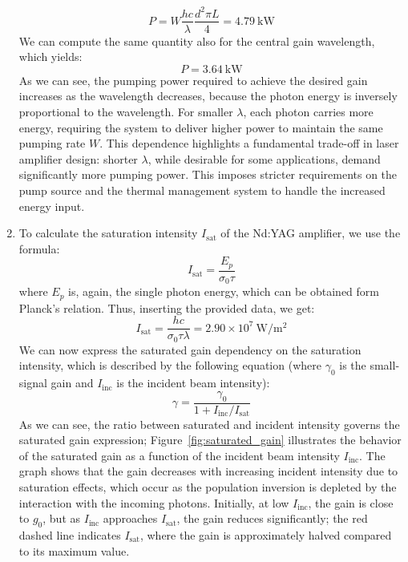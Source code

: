 \documentclass[prl, 11 pt]{revtex4-2}
\begin{document}
\begin{enumerate}
    $$
    P = W \frac{hc}{\lambda} \frac{d^2\pi L}{4} = 4.79~\si{\kW}
    $$
    We can compute the same quantity also for the central gain wavelength, which yields:
    $$
        P = 3.64~\si{\kW}
    $$
    As we can see, the pumping power required to achieve the desired gain increases as the wavelength decreases, because the photon energy is inversely proportional to the wavelength. For smaller $\lambda$, each photon carries more energy, requiring the system to deliver higher power to maintain the same pumping rate $W$. This dependence highlights a fundamental trade-off in laser amplifier design: shorter $\lambda$, while desirable for some applications, demand significantly more pumping power. This imposes stricter requirements on the pump source and the thermal management system to handle the increased energy input.

    \item To calculate the saturation intensity $I_{\text{sat}}$ of the Nd:YAG amplifier, we use the formula:
    \begin{equation}
        I_{\text{sat}} = \frac{E_p}{\sigma_0 \tau}
    \end{equation}
    where $E_p$ is, again, the single photon energy, which can be obtained form Planck's relation. Thus, inserting the provided data, we get:
    $$
        I_{\text{sat}} = \frac{h c}{\sigma_0 \tau \lambda} = 2.90\times 10^7~\si{\W}/\si{\meter^2}
    $$
    We can now express the saturated gain dependency on the saturation intensity, which is described by the following equation (where $\gamma_0$ is the small-signal gain and $I_{\mathrm{inc}}$ is the incident beam intensity):
    \begin{equation}
        \gamma = \frac{\gamma_0}{1 + I_{\mathrm{inc}} / I_{\mathrm{sat}}}
    \end{equation}
    As we can see, the ratio between saturated and incident intensity governs the saturated gain expression; Figure~\ref{fig:saturated_gain} illustrates the behavior of the saturated gain as a function of the incident beam intensity $I_{\mathrm{inc}}$. The graph shows that the gain decreases with increasing incident intensity due to saturation effects, which occur as the population inversion is depleted by the interaction with the incoming photons. Initially, at low $I_{\mathrm{inc}}$, the gain is close to $g_0$, but as $I_{\mathrm{inc}}$ approaches $I_{\mathrm{sat}}$, the gain reduces significantly; the red dashed line indicates $I_{\mathrm{sat}}$, where  the gain is approximately halved compared to its maximum value.
    

\end{enumerate}
\end{document}
